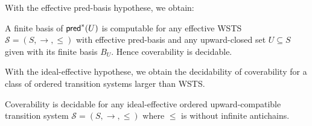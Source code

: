 With the effective pred-basis hypothese, we obtain:

\begin{theorem}\cite{DBLP:journals/tcs/FinkelS01,DBLP:journals/iandc/AbdullaCJT00}
A finite basis of $ \textsf{pred}^*(U)$ is computable for any effective WSTS $\mathscr{S}=(S, \rightarrow, \leq)$ with effective pred-basis and any upward-closed set $U \subseteq S$ given with its finite basis $B_U$. Hence coverability is decidable.
\end{theorem}

With the ideal-effective hypothese, we obtain the decidability of coverability for a class of ordered transition systems larger than WSTS.

\begin{theorem}\cite{BFM-ic17}
Coverability is decidable for any ideal-effective ordered upward-compatible transition system $\mathscr{S}=(S, \rightarrow, \leq)$ where $\leq$ is without infinite antichains.
\end{theorem}






